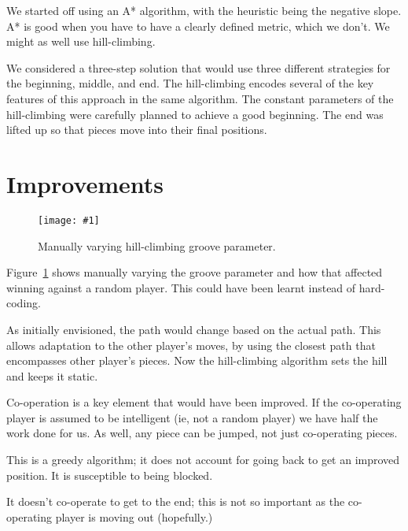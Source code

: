 \documentclass[twocolumn]{article}
\def\fig#1#2{\begin{figure}[!ht]\begin{center}
\texttt{[image: \#1]}
\end{center}\caption{#2}\label{#1}\end{figure}}
\begin{document}

We started off using an A* algorithm, with the heuristic being the negative slope. A* is good when you have to have a clearly defined metric, which we don't. We might as well use hill-climbing.\cite{gelperin1977optimality}

We considered a three-step solution that would use three different strategies for the beginning, middle, and end. The hill-climbing encodes several of the key features of this approach in the same algorithm. The constant parameters of the hill-climbing were carefully planned to achieve a good beginning. The end was lifted up so that pieces move into their final positions.


\section{Improvements}


\fig{stupid.pdf}{Manually varying hill-climbing groove parameter.}

Figure~\ref{stupid.pdf} shows manually varying the groove parameter and how that affected winning against a random player. This could have been learnt instead of hard-coding.

As initially envisioned, the path would change based on the actual path. This allows adaptation to the other player's moves, by using the closest path that encompasses other player's pieces. Now the hill-climbing algorithm sets the hill and keeps it static.

Co-operation is a key element that would have been improved. If the co-operating player is assumed to be intelligent (ie, not a random player) we have half the work done for us. As well, any piece can be jumped, not just co-operating pieces.


This is a greedy algorithm; it does not account for going back to get an improved position. It is susceptible to being blocked.

It doesn't co-operate to get to the end; this is not so important as the co-operating player is moving out (hopefully.)




\end{document}
